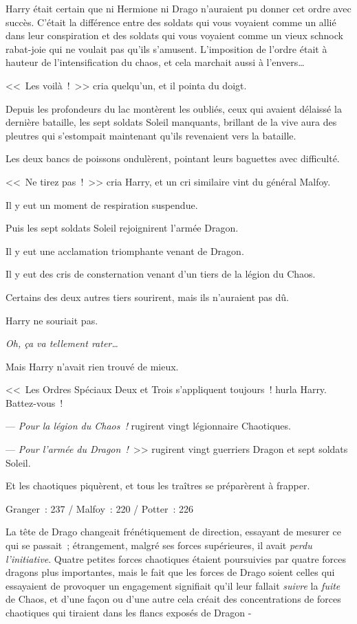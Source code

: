 Harry était certain que ni Hermione ni Drago n'auraient pu donner cet ordre avec succès. C'était la différence entre des soldats qui vous voyaient comme un allié dans leur conspiration et des soldats qui vous voyaient comme un vieux schnock rabat-joie qui ne voulait pas qu'ils s'amusent. L'imposition de l'ordre était à hauteur de l'intensification du chaos, et cela marchait aussi à l'envers…

<<~Les voilà~!~>> cria quelqu'un, et il pointa du doigt.

Depuis les profondeurs du lac montèrent les oubliés, ceux qui avaient délaissé la dernière bataille, les sept soldats Soleil manquants, brillant de la vive aura des pleutres qui s'estompait maintenant qu'ils revenaient vers la bataille.

Les deux bancs de poissons ondulèrent, pointant leurs baguettes avec difficulté.

<<~Ne tirez pas~!~>> cria Harry, et un cri similaire vint du général Malfoy.

Il y eut un moment de respiration suspendue.

Puis les sept soldats Soleil rejoignirent l'armée Dragon.

Il y eut une acclamation triomphante venant de Dragon.

Il y eut des cris de consternation venant d'un tiers de la légion du Chaos.

Certains des deux autres tiers sourirent, mais ils n'auraient pas dû.

Harry ne souriait pas.

\emph{Oh, ça va tellement rater…}

Mais Harry n'avait rien trouvé de mieux.

<<~Les Ordres Spéciaux Deux et Trois s'appliquent toujours~! hurla Harry. Battez-vous~!

--- \emph{Pour la légion du Chaos~!} rugirent vingt légionnaire Chaotiques.

--- \emph{Pour l'armée du Dragon~!}~>> rugirent vingt guerriers Dragon et sept soldats Soleil.

Et les chaotiques piquèrent, et tous les traîtres se préparèrent à frapper.

Granger~: 237 / Malfoy~: 220 / Potter~: 226

\later

La tête de Drago changeait frénétiquement de direction, essayant de mesurer ce qui se passait~; étrangement, malgré ses forces supérieures, il avait \emph{perdu l'initiative}. Quatre petites forces chaotiques étaient poursuivies par quatre forces dragons plus importantes, mais le fait que les forces de Drago soient celles qui essayaient de provoquer un engagement signifiait qu'il leur fallait \emph{suivre} la \emph{fuite} de Chaos, et d'une façon ou d'une autre cela créait des concentrations de forces chaotiques qui tiraient dans les flancs exposés de Dragon -

